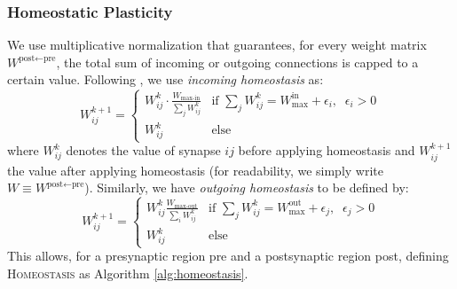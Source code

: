 \documentclass{article}
\begin{document}
\subsubsection*{Homeostatic Plasticity}
We use multiplicative normalization that guarantees, for every weight matrix $W^{\textrm{post}\leftarrow\textrm{pre}}$, the total sum of incoming or outgoing connections is capped to a certain value. Following , we use \textit{incoming homeostasis} as:
\begin{equation}
W_{ij}^{k+1}=
\begin{cases}
 W_{ij}^{k}\cdot\frac{W_\textrm{max-in}}{\sum_{j}W^{k}_{ij}} & \text{if }\sum_{j}W^{k}_{ij} = W_\textrm{max}^\textrm{in} + \epsilon_i, \;\; \epsilon_i > 0 \\[1.2ex]
W^k_{ij}& \textrm{else}
\end{cases}
\end{equation}
where $W^k_{ij}$ denotes the value of synapse $ij$ before applying homeostasis and $W^{k+1}_{ij}$ the value after applying homeostasis (for readability, we simply write $W \equiv W^{\textrm{post}\leftarrow\textrm{pre}}$).
Similarly, we have \textit{outgoing homeostasis} to be defined by:
\begin{equation}
W_{ij}^{k+1} =
\begin{cases}
  W_{ij}^{k}\frac{W_\textrm{max-out}}{\sum_{i}W^k_{ij}} & \text{if }\sum_{j}W^k_{ij} = W_\textrm{max}^\textrm{out} + \epsilon_j, \;\; \epsilon_j > 0 \\[1.2ex]
W^k_{ij} & \textrm{else}
\end{cases}
\end{equation}
This allows, for a presynaptic region pre and a postsynaptic region post, defining \textsc{Homeostasis} as Algorithm \ref{alg:homeostasis}.
\end{document}
